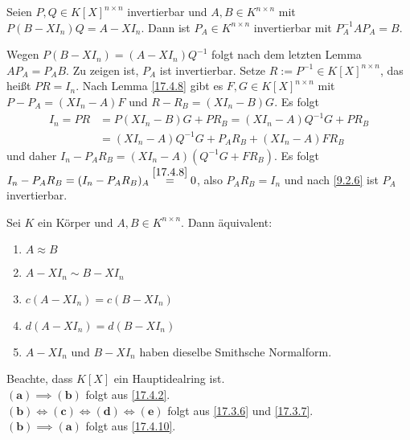 \documentclass[../../main.tex]{subfiles}
\begin{document}
\begin{sat}\label{17.4.10}
Seien $P,Q\in K[X]^{n\times n}$ invertierbar und $A,B\in K^{n\times n}$ mit $P(B-XI_n)Q=A-XI_n$. Dann ist $P_A\in K^{n\times n}$ invertierbar mit $P_A^{-1}AP_A=B$.
\end{sat}
\begin{cproof}
Wegen $P(B-XI_n)=(A-XI_n)Q^{-1}$ folgt nach dem letzten Lemma $AP_A=P_AB$. Zu zeigen ist, $P_A$ ist invertierbar. Setze $R:=P^{-1}\in K[X]^{n\times n}$, das heißt $PR=I_n$. Nach Lemma \ref{17.4.8} gibt es $F,G\in K[X]^{n\times n}$ mit $P-P_A=(XI_n-A)F$ und $R-R_B=(XI_n-B)G$. Es folgt
\begin{align*}
I_n=PR&=P(XI_n-B)G+PR_B=(XI_n-A)Q^{-1}G+PR_B\\
&=(XI_n-A)Q^{-1}G+P_AR_B+(XI_n-A)FR_B
\end{align*}
und daher $I_n-P_AR_B=(XI_n-A)(Q^{-1}G+FR_B)$. Es folgt $I_n-P_AR_B=(I_n-P_AR_B)_A\stackrel{\ref{17.4.8}}{=}0$, also $P_AR_B=I_n$ und nach \ref{9.2.6} ist $P_A$ invertierbar.
\end{cproof}

\begin{kor}\label{17.4.11}
Sei $K$ ein Körper und $A,B\in K^{n\times n}$. Dann äquivalent:
\begin{enumerate}[\normalfont(a)]
\item $A\approx B$
\item $A-XI_n\sim B-XI_n$
\item $c(A-XI_n)=c(B-XI_n)$
\item $d(A-XI_n)=d(B-XI_n)$
\item $A-XI_n$ und $B-XI_n$ haben dieselbe Smithsche Normalform.
\end{enumerate}
\end{kor}
\begin{cproof}
Beachte, dass $K[X]$ ein Hauptidealring ist.\\
$\boldsymbol{(a)\implies(b)}$ folgt aus \ref{17.4.2}.\\

\noindent$\boldsymbol{(b)\Longleftrightarrow(c)\Longleftrightarrow(d)\Longleftrightarrow(e)}$ folgt aus \ref{17.3.6} und \ref{17.3.7}.\\

\noindent $\boldsymbol{(b)\implies(a)}$ folgt aus \ref{17.4.10}.
\end{cproof}
\end{document}
